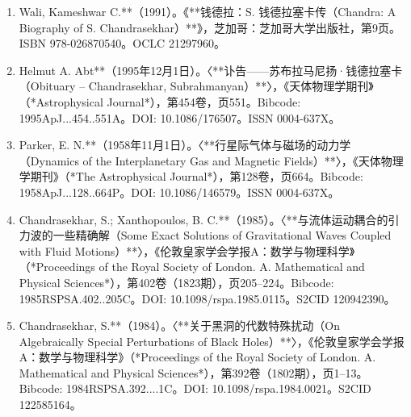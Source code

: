 \begin{enumerate}
\item Wali, Kameshwar C.**（1991）。《**钱德拉：S. 钱德拉塞卡传（Chandra: A Biography of S. Chandrasekhar）**》，芝加哥：芝加哥大学出版社，第9页。ISBN 978-026870540。OCLC 21297960。
\item Helmut A. Abt**（1995年12月1日）。〈**讣告——苏布拉马尼扬·钱德拉塞卡（Obituary – Chandrasekhar, Subrahmanyan）**〉，《天体物理学期刊》（*Astrophysical Journal*），第454卷，页551。Bibcode: 1995ApJ...454..551A。DOI: 10.1086/176507。ISSN 0004-637X。
\item Parker, E. N.**（1958年11月1日）。〈**行星际气体与磁场的动力学（Dynamics of the Interplanetary Gas and Magnetic Fields）**〉，《天体物理学期刊》（*The Astrophysical Journal*），第128卷，页664。Bibcode: 1958ApJ...128..664P。DOI: 10.1086/146579。ISSN 0004-637X。
\item Chandrasekhar, S.; Xanthopoulos, B. C.**（1985）。〈**与流体运动耦合的引力波的一些精确解（Some Exact Solutions of Gravitational Waves Coupled with Fluid Motions）**〉，《伦敦皇家学会学报A：数学与物理科学》（*Proceedings of the Royal Society of London. A. Mathematical and Physical Sciences*），第402卷（1823期），页205–224。Bibcode: 1985RSPSA.402..205C。DOI: 10.1098/rspa.1985.0115。S2CID 120942390。
\item Chandrasekhar, S.**（1984）。〈**关于黑洞的代数特殊扰动（On Algebraically Special Perturbations of Black Holes）**〉，《伦敦皇家学会学报A：数学与物理科学》（*Proceedings of the Royal Society of London. A. Mathematical and Physical Sciences*），第392卷（1802期），页1–13。Bibcode: 1984RSPSA.392....1C。DOI: 10.1098/rspa.1984.0021。S2CID 122585164。
\end{enumerate}